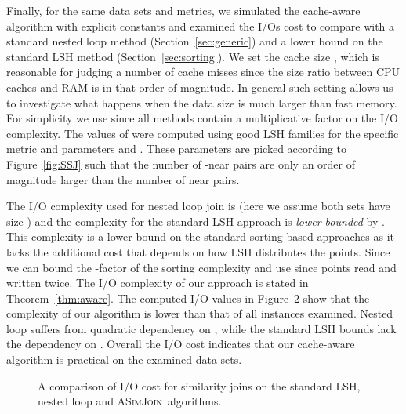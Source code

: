 \documentclass{llncs}
\newcommand{\ASimJoin}{\textsc{ASimJoin}}
\begin{document}
Finally, for the same data sets and metrics, we simulated the cache-aware algorithm with explicit constants and examined the I/Os cost to compare with a standard nested loop method (Section~\ref{sec:generic}) and a lower bound on the standard LSH method (Section~\ref{sec:sorting}).
We set the cache size , which is reasonable for judging a number of cache misses since the size ratio between CPU caches and RAM is in that order of magnitude.
In general such setting allows us to investigate what happens when the data size is much larger than fast memory.
For simplicity we use  since all methods contain a multiplicative factor  on the I/O complexity. 
The values of  were computed using good LSH families for the specific metric and parameters  and .
These parameters are picked according to Figure~\ref{fig:SSJ} such that the number of -near pairs are only an order of magnitude larger than the number of near pairs.

The I/O complexity used for nested loop join is  (here we assume both sets have size ) and the complexity for the standard LSH approach is \emph{lower bounded} by .
This complexity is a lower bound on the standard sorting based approaches as it lacks the additional cost that depends on how LSH distributes the points.
Since  we can bound the -factor of the sorting complexity and use  since  points read and written twice. 
The I/O complexity of our approach is stated in Theorem~\ref{thm:aware}. 
The computed I/O-values in Figure~2 show that the complexity of our algorithm is lower than that of all instances examined.
Nested loop suffers from quadratic dependency on , while the standard LSH bounds lack the dependency on . 
Overall the I/O cost indicates that our cache-aware algorithm is practical on the examined data sets.

\begin{figure*}[t]
\begin{center}
\label{fig:ASSJ}
\caption{A comparison of I/O cost for similarity joins on the standard LSH, nested loop and \ASimJoin\ algorithms.}
\end{center}
\end{figure*}
\end{document}
